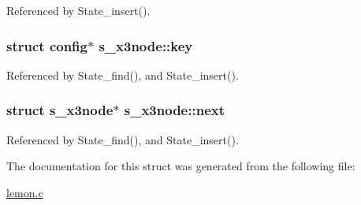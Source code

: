 Referenced by State\-\_\-insert().

\hypertarget{structs__x3node_ad8634c743549932f3f7c19f834592021}{
\subsubsection[{key}]{\setlength{\rightskip}{0pt plus 5cm}struct {\bf config}$\ast$ s\-\_\-x3node\-::key}}\label{structs__x3node_ad8634c743549932f3f7c19f834592021}


Referenced by State\-\_\-find(), and State\-\_\-insert().

\hypertarget{structs__x3node_ab2d7b565ebfc43ea239a90068fdf3670}{
\subsubsection[{next}]{\setlength{\rightskip}{0pt plus 5cm}struct {\bf s\-\_\-x3node}$\ast$ s\-\_\-x3node\-::next}}\label{structs__x3node_ab2d7b565ebfc43ea239a90068fdf3670}


Referenced by State\-\_\-find(), and State\-\_\-insert().



The documentation for this struct was generated from the following file\-:\begin{DoxyCompactItemize}
\item 
\hyperlink{lemon_8c}{lemon.\-c}\end{DoxyCompactItemize}
